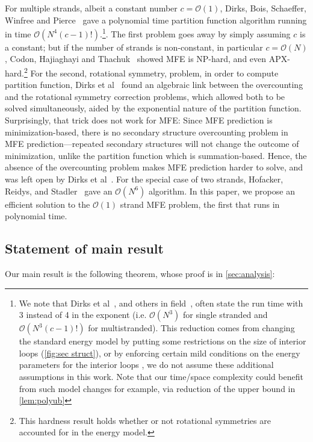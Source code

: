 \documentclass[11pt,letterpaper]{article}  \usepackage[margin=1in]{geometry}
\theoremstyle{definition}  \newtheorem{Definition}[theorem]{Definition}
\begin{document}
For multiple strands, albeit a constant number $c = \mathcal{O}(1)$, 
Dirks,  Bois, Schaeffer, Winfree and  
Pierce~\cite{dirks2007thermodynamic} gave a polynomial time partition function algorithm running in time $\mathcal{O}(N^4 (c-1)!)$.\footnote{We note that Dirks et al~\cite{dirks2007thermodynamic}, and others in field~\cite{zukeroptimal,zukerrna,condon2021predicting,waterman1986rapid,mccaskill1990equilibrium,boehmer2024rna}, often state the run time with 3  instead of 4 in the exponent (i.e. $\mathcal{O}(N^3)$ for single stranded and $\mathcal{O}(N^3 (c-1)!)$ for multistranded). This reduction comes from changing the standard energy model by putting some restrictions on the size of interior loops (\cref{fig:sec struct}), or by enforcing certain mild conditions on the energy parameters for the interior loops  \cite{lyngso1999fast,hofacker2012symmetric}, we do not assume these additional assumptions in this work.\label{ft:N3} Note that our time/space complexity could benefit from such model changes for example, via reduction of the upper bound in \cref{lem:polyub}}. 
The first problem goes away by simply assuming $c$ is a constant;
but if the number of strands is non-constant, in particular $c = \mathcal{O}(N)$, 
Codon, Hajiaghayi and Thachuk~\cite{condon2021predicting} showed MFE is NP-hard, and even APX-hard.\footnote{This hardness result holds whether or not rotational symmetries are accounted for in the energy model.} 
For the second, rotational symmetry, problem, in order to compute partition function, Dirks et al~\cite{dirks2007thermodynamic} found an algebraic link between the overcounting and the rotational symmetry correction problems, which allowed both to be solved simultaneously, aided by the exponential nature of the partition function.  
Surprisingly, that trick does not work for MFE:
Since MFE prediction is minimization-based, 
there is no secondary structure overcounting problem in MFE prediction---repeated secondary structures will not change the outcome of minimization, unlike the partition function which is summation-based.
Hence, the absence of the overcounting problem makes MFE prediction harder to solve, and was left open by Dirks et al~\cite{dirks2007thermodynamic}.
For the special case of two strands, Hofacker, Reidys, and Stadler~\cite{hofacker2012symmetric} gave an $\mathcal{O}(N^6)$  algorithm. In this paper, we propose an efficient solution to the $\mathcal{O}(1)$ strand MFE problem, the first that runs in polynomial time. 



\subsection{Statement of main result}
Our main result is the following theorem, whose proof is in \cref{sec:analysis}: 
\end{document}
